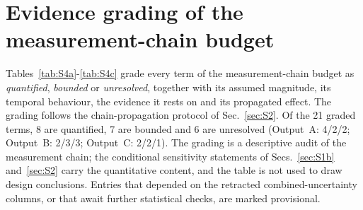 \documentclass[aps,prapplied,reprint,superscriptaddress]{revtex4-2}
\begin{document}
\section{Evidence grading of the measurement-chain budget}
\label{sec:S5}

Tables~\ref{tab:S4a}-\ref{tab:S4c} grade every term of the measurement-chain budget as \emph{quantified}, \emph{bounded} or \emph{unresolved}, together with its assumed magnitude, its temporal behaviour, the evidence it rests on and its propagated effect. The grading follows the chain-propagation protocol of Sec.~\ref{sec:S2}. Of the 21 graded terms, 8 are quantified, 7 are bounded and 6 are unresolved (Output~A: 4/2/2; Output~B: 2/3/3; Output~C: 2/2/1). The grading is a descriptive audit of the measurement chain; the conditional sensitivity statements of Secs.~\ref{sec:S1b} and~\ref{sec:S2} carry the quantitative content, and the table is not used to draw design conclusions. Entries that depended on the retracted combined-uncertainty columns, or that await further statistical checks, are marked provisional.
\end{document}
